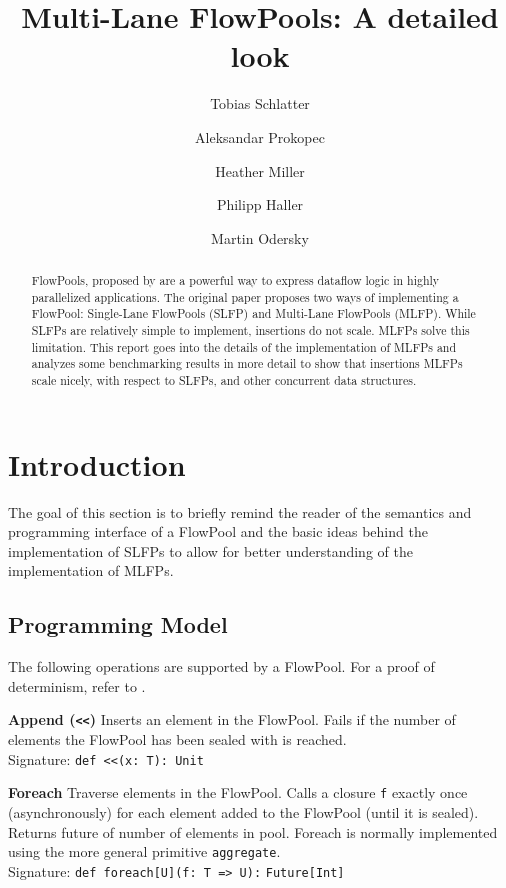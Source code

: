 \documentclass[runningheads,a4paper,fleqn]{llncs}
\begin{document}
\title{Multi-Lane FlowPools: A detailed look}
\author{Tobias Schlatter \and Aleksandar Prokopec \and
  Heather Miller \and Philipp Haller \and Martin
  Odersky}



\maketitle

\begin{abstract}
  FlowPools, proposed by \cite{FP12} are a powerful way to express
  dataflow logic in highly parallelized applications. The original
  paper proposes two ways of implementing a FlowPool: Single-Lane
  FlowPools (SLFP) and Multi-Lane FlowPools (MLFP). While SLFPs are
  relatively simple to implement, insertions do not scale. MLFPs solve
  this limitation. This report goes into the details of the
  implementation of MLFPs and analyzes some benchmarking results in
  more detail to show that insertions MLFPs scale nicely, with respect
  to SLFPs, and other concurrent data structures.
\end{abstract}

\section{Introduction}
The goal of this section is to briefly remind the reader of the
semantics and programming interface of a FlowPool and the basic ideas
behind the implementation of SLFPs to allow for better understanding
of the implementation of MLFPs.

\subsection{Programming Model}
The following operations are supported by a FlowPool. For a proof of
determinism, refer to \cite{FP12}.

\textbf{Append (\texttt{<<})} Inserts an element in the
FlowPool. Fails if the number of elements the FlowPool has been sealed
with is reached.\\
Signature: \verb+def <<(x: T): Unit+

\textbf{Foreach} Traverse elements in the FlowPool. Calls a closure
\verb+f+ exactly once (asynchronously) for each element added to the
FlowPool (until it is sealed). Returns future of number of elements in
pool. Foreach is normally implemented using the more general primitive
\verb+aggregate+.\\
Signature: \verb+def foreach[U](f: T => U):+ \verb+Future[Int]+
\end{document}
